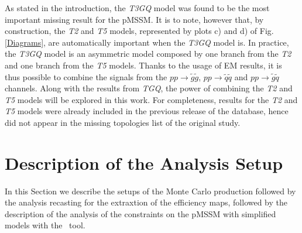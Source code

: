 \documentclass[epj,nopacs,fleqn]{svjour}
\begin{document}
%
As stated in the introduction, the \textit{T3GQ} model was found to be the most important missing result for the pMSSM. It is to note, however that, by construction, the \textit{T2} and \textit{T5} models, represented by plots c) and d) of Fig. \ref{Diagrams}, are automatically important when the \textit{T3GQ} model is. In practice, the \textit{T3GQ} model is an asymmetric model composed by one branch from the \textit{T2} and one branch from the \textit{T5} models. Thanks to the usage of EM results, it is thus possible to combine the signals from the $pp \rightarrow \tilde g \tilde g$, $pp \rightarrow \tilde q \tilde q$ and $pp \rightarrow \tilde g \tilde q$ channels. Along with the results from \textit{TGQ}, the power of combining the \textit{T2} and \textit{T5} models will be explored in this work. For completeness, results for the \textit{T2} and \textit{T5} models were already included in the previous release of the database, hence did not appear in the missing topologies list of the original study.

\section{Description of the Analysis Setup}\label{sec::setup}
In this Section we describe the setups of the Monte Carlo production followed by the analysis recasting for the extraxtion of the efficiency maps, followed by the description of the analysis of the constraints on the pMSSM with simplified models with the \SMO~tool.
\end{document}
